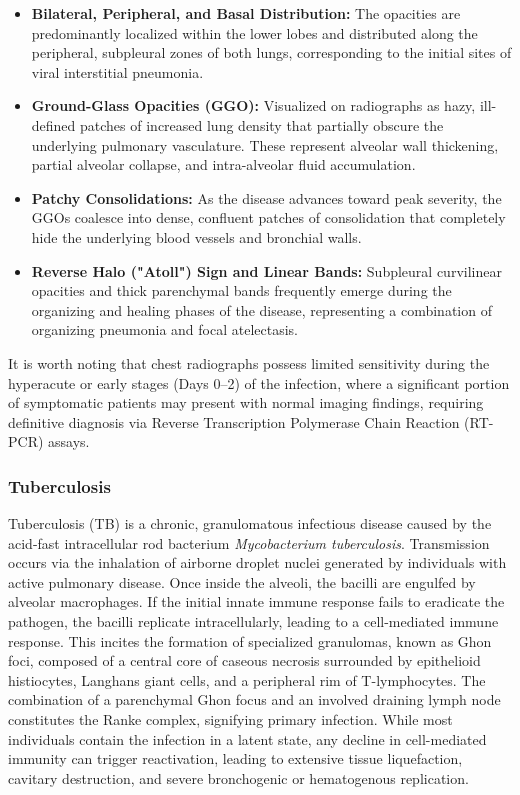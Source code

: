 \begin{itemize}
	\item \textbf{Bilateral, Peripheral, and Basal Distribution:} The opacities are predominantly localized within the lower lobes and distributed along the peripheral, subpleural zones of both lungs, corresponding to the initial sites of viral interstitial pneumonia.
	\item \textbf{Ground-Glass Opacities (GGO):} Visualized on radiographs as hazy, ill-defined patches of increased lung density that partially obscure the underlying pulmonary vasculature. These represent alveolar wall thickening, partial alveolar collapse, and intra-alveolar fluid accumulation.
	\item \textbf{Patchy Consolidations:} As the disease advances toward peak severity, the GGOs coalesce into dense, confluent patches of consolidation that completely hide the underlying blood vessels and bronchial walls.
	\item \textbf{Reverse Halo ("Atoll") Sign and Linear Bands:} Subpleural curvilinear opacities and thick parenchymal bands frequently emerge during the organizing and healing phases of the disease, representing a combination of organizing pneumonia and focal atelectasis.
\end{itemize}

It is worth noting that chest radiographs possess limited sensitivity during the hyperacute or early stages (Days 0--2) of the infection, where a significant portion of symptomatic patients may present with normal imaging findings, requiring definitive diagnosis via Reverse Transcription Polymerase Chain Reaction (RT-PCR) assays.

\subsubsection{Tuberculosis}

Tuberculosis (TB) is a chronic, granulomatous infectious disease caused by the acid-fast intracellular rod bacterium \textit{Mycobacterium tuberculosis}. Transmission occurs via the inhalation of airborne droplet nuclei generated by individuals with active pulmonary disease. Once inside the alveoli, the bacilli are engulfed by alveolar macrophages. If the initial innate immune response fails to eradicate the pathogen, the bacilli replicate intracellularly, leading to a cell-mediated immune response. This incites the formation of specialized granulomas, known as Ghon foci, composed of a central core of caseous necrosis surrounded by epithelioid histiocytes, Langhans giant cells, and a peripheral rim of T-lymphocytes. The combination of a parenchymal Ghon focus and an involved draining lymph node constitutes the Ranke complex, signifying primary infection. While most individuals contain the infection in a latent state, any decline in cell-mediated immunity can trigger reactivation, leading to extensive tissue liquefaction, cavitary destruction, and severe bronchogenic or hematogenous replication.

